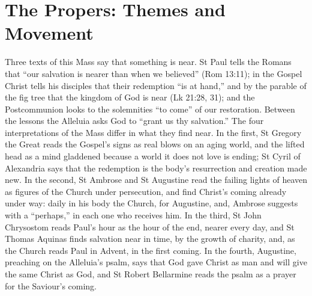 
\section{The Propers: Themes and Movement}

Three texts of this Mass say that something is near. St Paul tells the Romans
that ``our salvation is nearer than when we believed'' (Rom 13:11); in the
Gospel Christ tells his disciples that their redemption ``is at hand,'' and by
the parable of the fig tree that the kingdom of God is near (Lk 21:28, 31); and the
Postcommunion looks to the solemnities ``to come'' of our restoration. Between
the lessons the Alleluia asks God to ``grant us thy salvation.'' The four
interpretations of the Mass differ in what they find near. In the first,
St Gregory the Great reads the Gospel's signs as real blows on an aging
world, and the lifted head as a mind gladdened because a world it does not
love is ending; St Cyril of Alexandria says that the redemption is the body's
resurrection and creation made new. In the second, St Ambrose and St
Augustine read the failing lights of heaven as figures of the Church under
persecution, and find Christ's coming already under way: daily in his body
the Church, for Augustine, and, Ambrose suggests with a ``perhaps,'' in each
one who receives him. In the third, St John Chrysostom reads Paul's hour as
the hour of the end, nearer every day, and St Thomas Aquinas finds salvation
near in time, by the growth of charity, and, as the Church reads Paul in
Advent, in the first coming. In the fourth, Augustine, preaching on the
Alleluia's psalm, says that God gave Christ as man and will give the same
Christ as God, and St Robert Bellarmine reads the psalm as a prayer for the
Saviour's coming.

